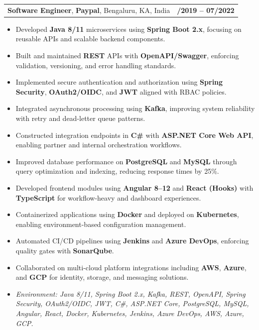 \documentclass[letterpaper,11pt]{article}
\makeatletter
\newcommand{\resumeItem}[1]{
  \item\footnotesize{
    {#1 \vspace{-2pt}}
  }
}
\newcommand{\resumeSubheading}[4]{
  \vspace{-2pt}\item
    \begin{tabular*}{1.0\textwidth}[t]{l@{\extracolsep{\fill}}r}
      \textbf{\fontsize{10pt}{14pt}\selectfont #3}, \textbf{\fontsize{10pt}{14pt}\selectfont #1}, \fontsize{10pt}{14pt}\selectfont #4 & \textbf{\fontsize{10pt}{14pt}\selectfont #2} \\
    \end{tabular*}\vspace{-7pt}
}
\newcommand{\resumeItemListStart}{\begin{itemize}[leftmargin=*]}
\newcommand{\resumeItemListEnd}{\end{itemize}\vspace{-5pt}}
\makeatother
\begin{document}
\resumeSubheading
{Paypal}{08/2019 -- 07/2022}
{Software Engineer}{Bengaluru, KA, India}
\resumeItemListStart
  \resumeItem{Developed \textbf{Java 8/11} microservices using \textbf{Spring Boot 2.x}, focusing on reusable APIs and scalable backend components.}
  \resumeItem{Built and maintained \textbf{REST} APIs with \textbf{OpenAPI/Swagger}, enforcing validation, versioning, and error handling standards.}
  \resumeItem{Implemented secure authentication and authorization using \textbf{Spring Security}, \textbf{OAuth2/OIDC}, and \textbf{JWT} aligned with RBAC policies.}
  \resumeItem{Integrated asynchronous processing using \textbf{Kafka}, improving system reliability with retry and dead-letter queue patterns.}
  \resumeItem{Constructed integration endpoints in \textbf{C\#} with \textbf{ASP.NET Core Web API}, enabling partner and internal orchestration workflows.}
  \resumeItem{Improved database performance on \textbf{PostgreSQL} and \textbf{MySQL} through query optimization and indexing, reducing response times by 25\%.}
  \resumeItem{Developed frontend modules using \textbf{Angular 8--12} and \textbf{React (Hooks)} with \textbf{TypeScript} for workflow-heavy and dashboard experiences.}
  \resumeItem{Containerized applications using \textbf{Docker} and deployed on \textbf{Kubernetes}, enabling environment-based configuration management.}
  \resumeItem{Automated CI/CD pipelines using \textbf{Jenkins} and \textbf{Azure DevOps}, enforcing quality gates with \textbf{SonarQube}.}
  \resumeItem{Collaborated on multi-cloud platform integrations including \textbf{AWS}, \textbf{Azure}, and \textbf{GCP} for identity, storage, and messaging solutions.}
  \resumeItem{\textit{Environment: Java 8/11, Spring Boot 2.x, Kafka, REST, OpenAPI, Spring Security, OAuth2/OIDC, JWT, C\#, ASP.NET Core, PostgreSQL, MySQL, Angular, React, Docker, Kubernetes, Jenkins, Azure DevOps, AWS, Azure, GCP.}}
\resumeItemListEnd
\end{document}
